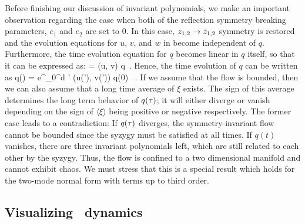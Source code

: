 \documentclass[aip,cha,
reprint,
secnumarabic,
nofootinbib, tightenlines,
nobibnotes, showkeys, showpacs,
superscriptaddress,
]{revtex4-1}
\begin{document}
Before finishing our discussion of invariant polynomials, we make 
an important observation regarding the case when both of the 
reflection symmetry breaking parameters, $e_{1}$ and $e_2$ are set 
to $0$. In this case, $z_{1,2} \rightarrow \bar{z}_{1,2}$ 
symmetry is restored and the evolution equations for $u$, $v$, and 
$w$ in  become independent of $q$. Furthermore, 
the time evolution equation for $q$ becomes linear in $q$ itself, 
so that it can be expressed as:
\beq
     = \xi (u, v) q \,.
Hence, the time evolution of $q$ can be written as
\beq
    q(\zeit) =  e^{\int_0^\zeit d \zeit' \xi (u(\zeit'), v(\zeit'))} q(0) \, .
If we assume that the flow is bounded, then we can also assume 
that a long time average of $\xi$ exists. The sign of this average 
determines the long term behavior of $q(\tau)$; it will either 
diverge or vanish depending on the sign of $\langle \xi \rangle$ 
being positive or negative respectively. The former case leads to 
a contradiction: If $q(\tau)$ diverges, the symmetry-invariant 
flow cannot be bounded since the syzygy  must be 
satisfied at all times. If $q(t)$ vanishes, there are three 
invariant polynomials left, which are still related to each other 
by the syzygy. Thus, the flow is confined to a two dimensional 
manifold and cannot exhibit chaos. We must stress that this is a 
special result which holds for the two-mode normal form with terms 
up to third order.

\subsection{Visualizing \twomode\ dynamics}
\label{s:visual}
\end{document}

